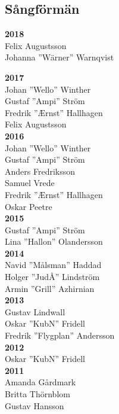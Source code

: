 \begin{flushleft}
\section{Sångförmän}
\vspace{-1em}
\end{flushleft}

{\large
\setlength{\parskip}{0.5em}
\setlength\columnsep{3em}

\begin{multicols}{2}
\textbf{2018}\\
Felix Augustsson\\
Johanna ''Wärner'' Warnqvist

\textbf{2017}\\
Johan ''Wello'' Winther\\
Gustaf ''Ampi'' Ström\\
Fredrik ''Ærnst'' Hallhagen\\
Felix Augustsson\\

\textbf{2016}\\
Johan ''Wello'' Winther\\
Gustaf ''Ampi'' Ström\\
Anders Fredriksson\\
Samuel Vrede\\
Fredrik ''Ærnst'' Hallhagen\\
Oskar Peetre\\

\textbf{2015}\\
Gustaf ''Ampi'' Ström\\
Lina ''Hallon'' Olandersson\\

\textbf{2014}\\
Navid ''Målsman'' Haddad\\
Holger ''JudÅ'' Lindström\\
Armin ''Grill'' Azhirnian\\

\textbf{2013}\\
Gustav Lindwall\\
Oskar ''KubN'' Fridell\\
Fredrik ''Flygplan'' Andersson\\

\textbf{2012}\\
Oskar ''KubN'' Fridell\\

\textbf{2011}\\
Amanda Gårdmark\\
Britta Thörnblom\\
Gustav Hansson\\


\end{multicols}}
